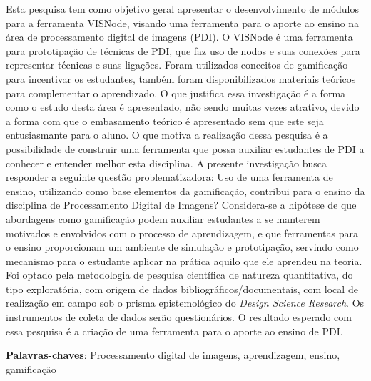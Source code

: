 \documentclass[
	12pt,				%
	oneside,			%
	a4paper,			%
	english,			%
	french,				%
	spanish,			%
	brazil,				%
	]{abntex2}
\begin{document}
\frenchspacing 


\imprimircapa
\imprimirfolhaderosto





\begin{resumo}
Esta pesquisa tem como objetivo geral apresentar o desenvolvimento de módulos para a ferramenta VISNode, visando  uma ferramenta para o aporte ao ensino na área de processamento digital de imagens (PDI). O VISNode é uma ferramenta para prototipação de técnicas de PDI, que faz uso de nodos e suas conexões para representar técnicas e suas ligações. Foram utilizados conceitos de gamificação para incentivar os estudantes, também foram disponibilizados materiais teóricos para complementar o aprendizado. O que justifica essa investigação é a forma como o estudo desta área é apresentado, não sendo muitas vezes atrativo, devido a forma com que o embasamento teórico é apresentado sem que este seja entusiasmante para o aluno. O que motiva a realização dessa pesquisa é a possibilidade de construir uma ferramenta que possa auxiliar estudantes de PDI a conhecer e entender melhor esta disciplina. A presente investigação busca responder a seguinte questão problematizadora: Uso de uma ferramenta de ensino, utilizando como base elementos da gamificação, contribui para o ensino da disciplina de Processamento Digital de Imagens? Considera-se a hipótese de que abordagens como gamificação podem auxiliar estudantes a se manterem motivados e envolvidos com o processo de aprendizagem, e que ferramentas para o ensino proporcionam um ambiente de simulação e prototipação, servindo como mecanismo para o estudante aplicar na prática aquilo que ele aprendeu na teoria. Foi optado pela metodologia de pesquisa científica de natureza quantitativa, do tipo exploratória, com origem de dados bibliográficos/documentais, com local de realização em campo sob o prisma epistemológico do \textit{Design Science Research}. Os instrumentos de coleta de dados serão questionários. O resultado esperado com essa pesquisa é a criação de uma ferramenta para o aporte ao ensino de PDI.

 \vspace{\onelineskip}
    
 \noindent
 \textbf{Palavras-chaves}: Processamento digital de imagens, aprendizagem, ensino, gamificação
\end{resumo}
\end{document}

